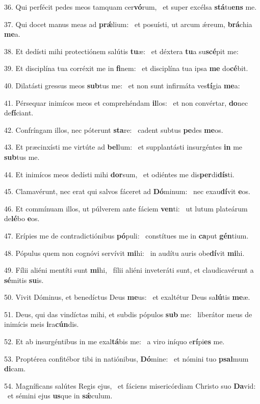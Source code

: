 36. Qui perfécit pedes meos tamquam cer\textbf{vó}rum, \ast\  et super excélsa \textbf{stá}tu\textbf{ens} me.\

37. Qui docet manus meas ad \textbf{prǽ}lium: \ast\  et posuísti, ut arcum ǽreum, \textbf{brá}chia \textbf{me}a.\

38. Et dedísti mihi protectiónem salútis \textbf{tu}æ: \ast\  et déxtera \textbf{tu}a su\textbf{scé}pit me:\

39. Et disciplína tua corréxit me in \textbf{fi}nem: \ast\  et disciplína tua ipsa \textbf{me} do\textbf{cé}bit.\

40. Dilatásti gressus meos \textbf{sub}tus me: \ast\  et non sunt infirmáta ves\textbf{tí}gia \textbf{me}a:\

41. Pérsequar inimícos meos et comprehéndam \textbf{il}los: \ast\  et non convértar, \textbf{do}nec de\textbf{fí}ciant.\

42. Confríngam illos, nec póterunt \textbf{sta}re: \ast\  cadent subtus \textbf{pe}des \textbf{me}os.\

43. Et præcinxísti me virtúte ad \textbf{bel}lum: \ast\  et supplantásti insurgéntes \textbf{in} me \textbf{sub}tus me.\

44. Et inimícos meos dedísti mihi \textbf{dor}sum, \ast\  et odiéntes me dis\textbf{per}di\textbf{dís}ti.\

45. Clamavérunt, nec erat qui salvos fáceret ad \textbf{Dó}minum: \ast\  nec exau\textbf{dí}vit \textbf{e}os.\

46. Et commínuam illos, ut púlverem ante fáciem \textbf{ven}ti: \ast\  ut lutum plateárum de\textbf{lé}bo \textbf{e}os.\

47. Erípies me de contradictiónibus \textbf{pó}puli: \ast\  constítues me in \textbf{ca}put \textbf{gén}tium.\

48. Pópulus quem non cognóvi servívit \textbf{mi}hi: \ast\  in audítu auris obe\textbf{dí}vit \textbf{mi}hi.\

49. Fílii aliéni mentíti sunt \textbf{mi}hi, \ast\  fílii aliéni inveteráti sunt, et claudicavérunt a \textbf{sé}mitis \textbf{su}is.\

50. Vivit Dóminus, et benedíctus Deus \textbf{me}us: \ast\  et exaltétur Deus sa\textbf{lú}tis \textbf{me}æ.\

51. Deus, qui das vindíctas mihi, et subdis pópulos \textbf{sub} me: \ast\  liberátor meus de inimícis meis \textbf{i}ra\textbf{cún}dis.\

52. Et ab insurgéntibus in me exal\textbf{tá}bis me: \ast\  a viro iníquo e\textbf{rí}pi\textbf{es} me.\

53. Proptérea confitébor tibi in natiónibus, \textbf{Dó}mine: \ast\  et nómini tuo \textbf{psal}mum \textbf{di}cam.\

54. Magníficans salútes Regis ejus, \dag\  et fáciens misericórdiam Christo suo \textbf{Da}vid: \ast\  et sémini ejus \textbf{us}que in \textbf{sǽ}culum.\

